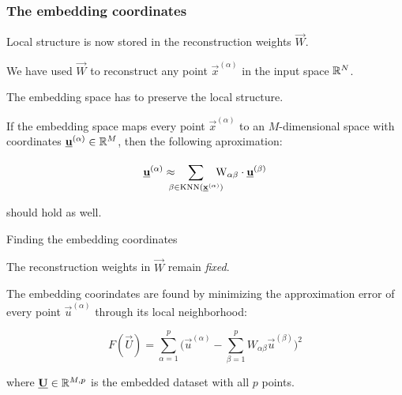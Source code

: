 \subsubsection{The embedding coordinates}

\begin{frame}{\subsubsecname}

Local structure is now stored in the reconstruction weights $\vec W$.

We have used $\vec W$ to reconstruct any point $\vec x^{(\alpha)}$ in the input space $\mathbb{R}^N$.

The embedding space has to preserve the local structure.

If the embedding space maps every point $\vec x^{(\alpha)}$ to an $M$-dimensional space with 
coordinates $\underline{\mathbf{u}}^{(\alpha)} \in \mathbb{R}^M$, then the following aproximation:

\begin{equation}\vec{u}^{(\alpha)} \approx \hspace{-3mm} \sum_{\beta \in \operatorname{KNN}(\vec{x}^{(\alpha)})}^{} \hspace{-3mm} \mathrm{W}_{\alpha \beta} \cdot \vec{u}^{(\beta)}
\end{equation}

should hold as well.

\end{frame}

\begin{frame}{Finding the embedding coordinates}

The reconstruction weights in $\vec W$ remain \emph{fixed}.

The embedding coorindates are found by minimizing the approximation error of every point $\vec u^{(\alpha)}$ through its local neighborhood:

\begin{equation}
	F(\vec U) =
    \sum_{\alpha=1}^{p} 
	\bigg(  \vec{u}^{(\alpha)}  - \sum_{\beta=1}^{p} W_{\alpha \beta} \vec{u}^{(\beta)}
	\bigg) ^ 2
\end{equation}

where $\underline{\mathbf{U}} \in \mathbb{R}^{M,p}$ is the embedded dataset with all $p$ points.

\end{frame}

